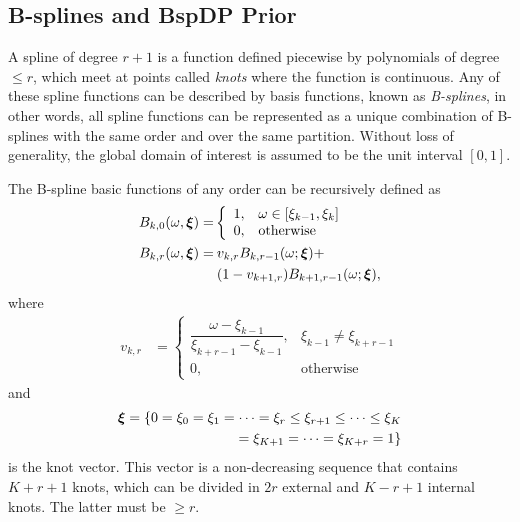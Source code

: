 \documentclass[twocolumn,final]{svjour3}
\newcommand{\bm}[1]{\mbox{\boldmath $#1$}}
\begin{document}
\subsection*{B-splines and BspDP Prior}

A spline of degree $r+1$ is a function defined piecewise by polynomials of degree $\leq r$, which meet at points called \textit{knots} where the function is continuous.  Any of these spline functions can be described by basis functions, known as \textit{B-splines}, in other words, all spline functions can be represented as a unique combination of B-splines with the same order and over the same partition.  Without loss of generality, the global domain of interest is assumed to be the unit interval $[0,1]$.

The B-spline basic functions of any order can be recursively defined as
\begin{align*}
B_{k,0}(\omega, \bm{\xi})=&	
\left\{
\begin{array}{ll}
1, & \omega \in [\xi_{k-1}, \xi_{k}] \\
0, & \mbox{otherwise} 
\end{array}
\right.\\
B_{k,r}(\omega, \bm{\xi}) = & \:v_{k,r}B_{k,r-1}(\omega; \bm{\xi}) + \\
& \: (1-v_{k+1,r})B_{k+1,r-1}(\omega; \bm{\xi}),	
\end{align*}
where	   
\begin{align*}	   
v_{k,r}&=	
\left\{
\begin{array}{ll}
\dfrac{\omega - \xi_{k-1}}{\xi_{k+r-1} - \xi_{k-1}}, & \xi_{k-1} \neq \xi_{k+r-1}\\
0, & \mbox{otherwise} 
\end{array}
\right.
\end{align*}
and 
\begin{align*}
\bm{\xi} = \{0 = \xi_0 = \xi_1 = \cdots = \xi_r \leq \xi_{r+1} \leq \cdots \leq \xi_{K}\\ = \xi_{K+1} = \cdots = \xi_{K+r} = 1 \}
\end{align*}
is the knot vector.  This vector is a non-decreasing sequence that contains $K+r+1$ knots, which can be divided in $2r$ external and $K-r+1$ internal knots.  The latter must be $\geq r$.

\end{document}
